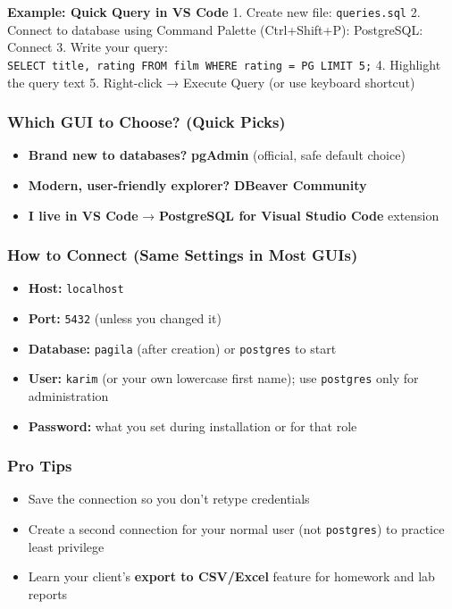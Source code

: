 \documentclass[
  letterpaper,
  DIV=11,
  numbers=noendperiod]{scrartcl}
\providecommand{\tightlist}{%
  \setlength{\itemsep}{0pt}\setlength{\parskip}{0pt}}\usepackage{longtable,booktabs,array}
\begin{document}
\textbf{Example: Quick Query in VS Code} 1. Create new file:
\texttt{queries.sql} 2. Connect to database using Command Palette
(Ctrl+Shift+P): PostgreSQL: Connect 3. Write your query:
\texttt{SELECT\ title,\ rating\ FROM\ film\ WHERE\ rating\ =\ \textquotesingle{}PG\textquotesingle{}\ LIMIT\ 5;}
4. Highlight the query text 5. Right-click → Execute Query (or use
keyboard shortcut)

\subsubsection{Which GUI to Choose? (Quick
Picks)}\label{which-gui-to-choose-quick-picks}

\begin{itemize}
\tightlist
\item
  \textbf{Brand new to databases?} \textbf{pgAdmin} (official, safe
  default choice)
\item
  \textbf{Modern, user-friendly explorer?} \textbf{DBeaver Community}
\item
  \textbf{I live in VS Code} → \textbf{PostgreSQL for Visual Studio
  Code} extension
\end{itemize}

\subsubsection{How to Connect (Same Settings in Most
GUIs)}\label{how-to-connect-same-settings-in-most-guis}

\begin{itemize}
\tightlist
\item
  \textbf{Host:} \texttt{localhost}
\item
  \textbf{Port:} \texttt{5432} (unless you changed it)
\item
  \textbf{Database:} \texttt{pagila} (after creation) or
  \texttt{postgres} to start
\item
  \textbf{User:} \texttt{karim} (or your own lowercase first name); use
  \texttt{postgres} only for administration
\item
  \textbf{Password:} what you set during installation or for that role
\end{itemize}

\subsubsection{Pro Tips}\label{pro-tips}

\begin{itemize}
\tightlist
\item
  Save the connection so you don't retype credentials
\item
  Create a second connection for your normal user (not
  \texttt{postgres}) to practice least privilege
\item
  Learn your client's \textbf{export to CSV/Excel} feature for homework
  and lab reports
\end{itemize}
\end{document}
